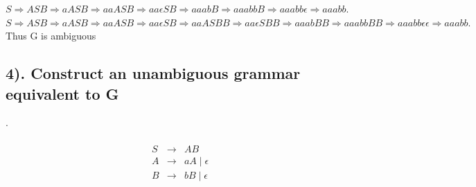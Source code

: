 \documentclass[20pt]{article} %
\begin{document}
$S \Rightarrow ASB \Rightarrow aASB \Rightarrow aaASB \Rightarrow aa\epsilon SB \Rightarrow aaabB \Rightarrow aaabbB \Rightarrow aaabb\epsilon \Rightarrow aaabb$. \\


$S \Rightarrow ASB \Rightarrow aASB \Rightarrow aaASB \Rightarrow aa\epsilon SB \Rightarrow aaASBB \Rightarrow aa\epsilon SBB \Rightarrow aaabBB \Rightarrow aaabbBB \Rightarrow aaabb\epsilon \epsilon \Rightarrow aaabb.$ \\

Thus G is ambiguous

\subsection{4). Construct an unambiguous grammar equivalent to G}.
 \begin{table}[!htbp]
 \[\begin{array}{ccc} 
&  \\
 S & \rightarrow & AB \\
 A & \rightarrow & aA \mid \epsilon \\
 B & \rightarrow  & bB \mid \epsilon \\
 \end{array}\]
 \end{table}
\end{document}
